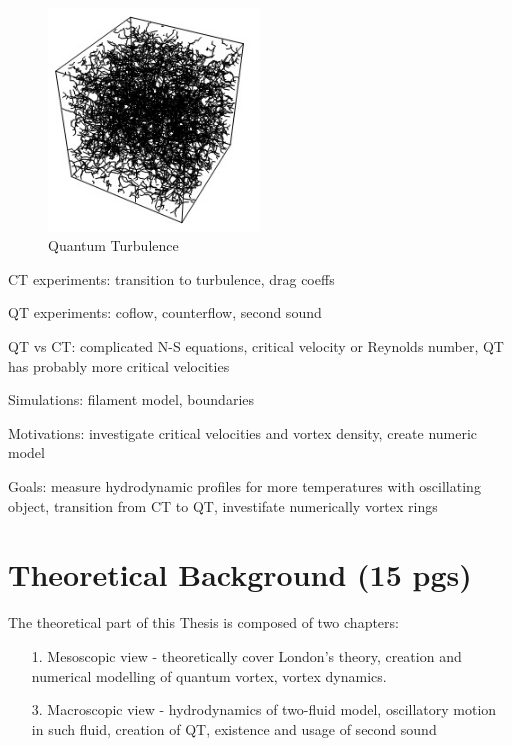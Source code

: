 	\begin{figure}[h]
		\centering
		\includegraphics[width=0.5\textwidth]{graphics/theory/QT-tangle}
		\caption{Quantum Turbulence}
		\label{QT}
	\end{figure}

	CT experiments: transition to turbulence, drag coeffs

	QT experiments: coflow, counterflow, second sound

	QT vs CT: complicated N-S equations, critical velocity or Reynolds number, QT has probably more critical velocities

	Simulations: filament model, boundaries

	Motivations: investigate critical velocities and vortex density, create numeric model

	Goals: measure hydrodynamic profiles for more temperatures with oscillating object, transition from CT to QT, investifate numerically vortex rings

\newpage
\chapter{Theoretical Background (15 pgs)}

The theoretical part of this Thesis is composed of two chapters:

\begin{itemize}
	\item[1.] Mesoscopic view - theoretically cover London's theory, creation and numerical modelling of quantum vortex, vortex dynamics.

	\item[3.] Macroscopic view - hydrodynamics of two-fluid model, oscillatory motion in such fluid, creation of QT, existence and usage of second sound

\end{itemize}

